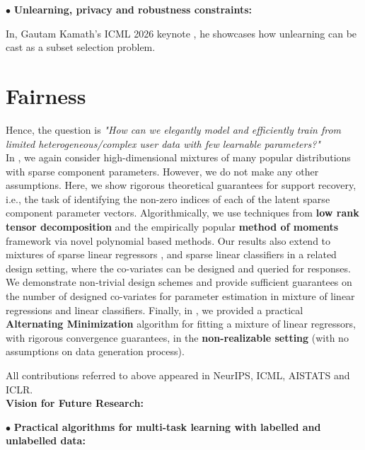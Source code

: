 \documentclass[11pt,a4paper,sans,usenames,dvipsnames]{moderncv} %
\begin{document}
$\bullet{}$ \textbf{Unlearning, privacy and robustness constraints:}

In, Gautam Kamath's ICML 2026 keynote \cite{suriyakumar2026unlearning}, he showcases how unlearning can be cast as a subset selection problem.

\section{Fairness}

Hence, the question is
\noindent \textit{"How can we elegantly model and efficiently train from limited heterogeneous/complex user data with few learnable parameters?"} \\




In \cite{pal2022learning}, we again consider high-dimensional mixtures of many popular distributions with sparse component parameters. However, we do not make any other assumptions. Here, we show rigorous theoretical guarantees for support recovery, i.e., the task of identifying the non-zero indices of each of the latent sparse component parameter vectors.
Algorithmically, we use
techniques from \textbf{low rank tensor decomposition} and
the empirically popular \textbf{method of moments} framework via novel polynomial based methods. Our results also extend to mixtures of sparse linear regressors \cite{KrishnamurthyM020,mazumdar2020recovery}, and sparse linear classifiers \cite{gandikota2020learning,pal2021support} in a related design setting, where the co-variates can be designed and queried for responses. We demonstrate non-trivial design schemes and
provide sufficient guarantees on the number of designed co-variates for parameter estimation in mixture of linear regressions and linear classifiers. Finally, in \cite{ghosh2022learning}, we provided a practical \textbf{Alternating Minimization} algorithm for fitting a mixture of linear regressors, with rigorous convergence guarantees, in the \textbf{non-realizable setting} (with no assumptions on data generation process).

All contributions referred to above appeared in NeurIPS, ICML, AISTATS and ICLR.\\

\noindent \textbf{Vision for Future Research:}

$\bullet{}$ \textbf{Practical  algorithms for multi-task learning with labelled and unlabelled data:}
\end{document}
